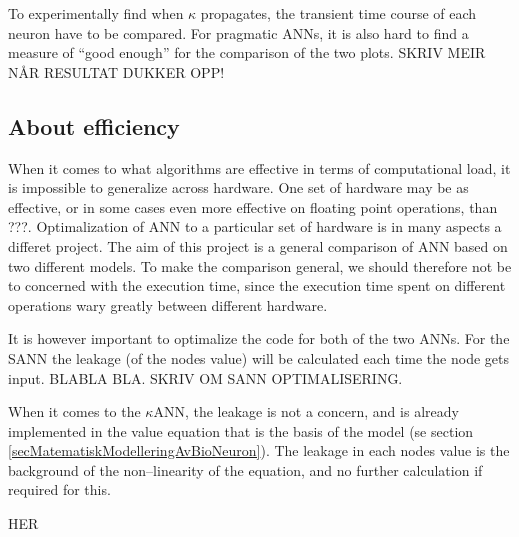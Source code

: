 	To experimentally find when $\kappa$ propagates, the transient time course of each neuron have to be compared.
	For pragmatic ANNs, it is also hard to find a measure of ``good enough'' for the comparison of the two plots. 
	SKRIV MEIR NÅR RESULTAT DUKKER OPP! %











\subsection{About efficiency}
When it comes to what algorithms are effective in terms of computational load, it is impossible to generalize across hardware.
One set of hardware may be as effective, or in some cases even more effective on floating point operations, than ???. %
Optimalization of ANN to a particular set of hardware is in many aspects a differet project. 
The aim of this project is a general comparison of ANN based on two different models.
To make the comparison general, we should therefore not be to concerned with the execution time, since the execution time spent on different operations wary greatly between different hardware.

It is however important to optimalize the code for both of the two ANNs. 
For the SANN the leakage (of the nodes value) will be calculated each time the node gets input.
BLABLA BLA. SKRIV OM SANN OPTIMALISERING.


When it comes to the $\kappa$ANN, the leakage is not a concern, and is already implemented in the value equation that is the basis of the model (se section \ref{secMatematiskModelleringAvBioNeuron}).
The leakage in each nodes value is the background of the non--linearity of the equation, and no further calculation if required for this.

\large{HER}

